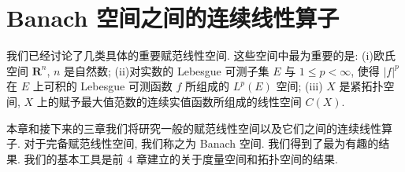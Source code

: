 \documentclass[../main.tex]{subfiles}
\begin{document}
\chapter{Banach 空间之间的连续线性算子}\label{chapter:ch13-Banach算子}

我们已经讨论了几类具体的重要赋范线性空间. 这些空间中最为重要的是: (i)欧氏空间 $\mathbf{R}^{n}$, $n$ 是自然数; (ii)对实数的 Lebesgue 可测子集 $E$ 与 $1\leqslant p<\infty$, 使得 $|f|^{p}$ 在 $E$ 上可积的 Lebesgue 可测函数 $f$ 所组成的 $L^{p}(E)$ 空间; (iii) $X$ 是紧拓扑空间, $X$ 上的赋予最大值范数的连续实值函数所组成的线性空间 $C(X)$.

本章和接下来的三章我们将研究一般的赋范线性空间以及它们之间的连续线性算子. 对于完备赋范线性空间, 我们称之为 Banach 空间. 我们得到了最为有趣的结果. 我们的基本工具是前 4 章建立的关于度量空间和拓扑空间的结果.










\end{document}
